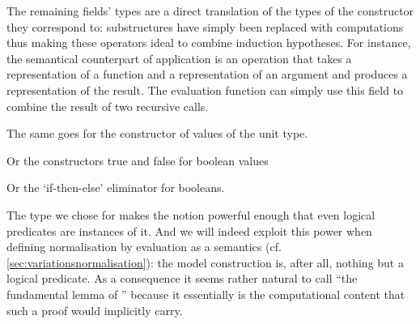 
The remaining fields' types are a direct translation of the types of the
constructor they correspond to: substructures have simply been replaced with
computations thus making these operators ideal to combine induction hypotheses.
For instance, the semantical counterpart of application is an operation that
takes a representation of a function and a representation of an argument and
produces a representation of the result. The evaluation function can simply
use this field to combine the result of two recursive calls.

\begin{AgdaSuppressSpace}
\end{AgdaSuppressSpace}

The same goes for the constructor  of values of the unit type.

\begin{AgdaSuppressSpace}
\end{AgdaSuppressSpace}

Or the constructors true and false for boolean values

\begin{AgdaSuppressSpace}
\end{AgdaSuppressSpace}

Or the `if-then-else' eliminator for booleans.

\begin{AgdaSuppressSpace}
\end{AgdaSuppressSpace}

The type we chose for  makes the  notion powerful
enough that even logical predicates are instances of it. And we will indeed
exploit this power when defining normalisation by evaluation as a semantics
(cf. \cref{sec:variationsnormalisation}):
the model construction is, after all, nothing but a logical predicate.
As a consequence it seems rather natural to call 
``the fundamental lemma of '' because it essentially is the
computational content that such a proof would implicitly carry.

